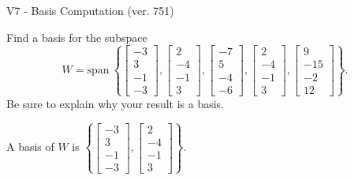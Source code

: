 \begin{exercise}
  \begin{exerciseTitle}V7 - Basis Computation (ver. 751)\end{exerciseTitle}
  \begin{exerciseStatement}
    Find a basis for the subspace 
\[W=\mathrm{span}\ \left\{\left[\begin{array}{r}
-3 \\
3 \\
-1 \\
-3
\end{array}\right] , \left[\begin{array}{r}
2 \\
-4 \\
-1 \\
3
\end{array}\right] , \left[\begin{array}{r}
-7 \\
5 \\
-4 \\
-6
\end{array}\right] , \left[\begin{array}{r}
2 \\
-4 \\
-1 \\
3
\end{array}\right] , \left[\begin{array}{r}
9 \\
-15 \\
-2 \\
12
\end{array}\right]\right\}.\]
 Be sure to explain why your result is a basis.


  \end{exerciseStatement}
  \begin{exerciseAnswer}
   A basis of \(W\) is  \(\left\{\left[\begin{array}{r}
-3 \\
3 \\
-1 \\
-3
\end{array}\right] , \left[\begin{array}{r}
2 \\
-4 \\
-1 \\
3
\end{array}\right]\right\}\).
  


  \end{exerciseAnswer}
\end{exercise}